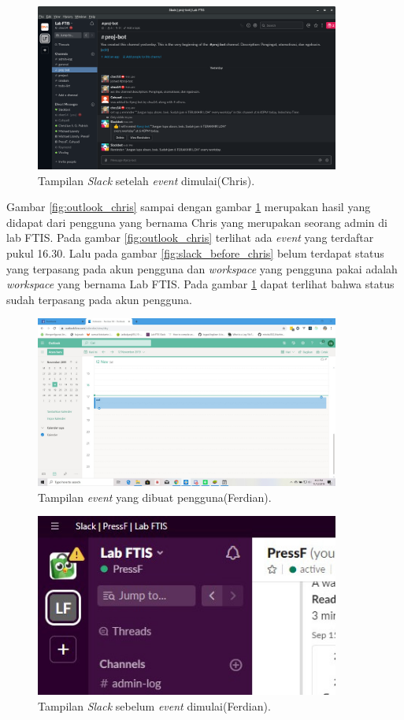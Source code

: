\begin{figure}[h]
  \includegraphics[width=10cm]{./Gambar/PengujianChris/Slack_After.png}
  \centering
  \caption{Tampilan \textit{Slack} setelah \textit{event} dimulai(Chris).}
  \label{fig:slack_after_chris}
\end{figure}

Gambar \ref{fig:outlook_chris} sampai dengan gambar \ref{fig:slack_after_chris} merupakan hasil yang didapat dari pengguna yang bernama Chris yang merupakan seorang admin di lab FTIS. Pada gambar \ref{fig:outlook_chris} terlihat ada \textit{event} yang terdaftar pukul 16.30. Lalu pada gambar \ref{fig:slack_before_chris} belum terdapat status yang terpasang pada akun pengguna dan \textit{workspace} yang pengguna pakai adalah \textit{workspace} yang bernama Lab FTIS. Pada gambar \ref{fig:slack_after_chris} dapat terlihat bahwa status sudah terpasang pada akun pengguna. 
\clearpage

\begin{figure}[h]
  \includegraphics[width=10cm]{./Gambar/PengujianFerdian/Outlook.jpg}
  \centering
  \caption{Tampilan \textit{event} yang dibuat pengguna(Ferdian).}
  \label{fig:outlook_ferdian}
\end{figure}

\begin{figure}[h]
  \includegraphics[width=10cm]{./Gambar/PengujianFerdian/Slack_Before(2).jpg}
  \centering
  \caption{Tampilan \textit{Slack} sebelum \textit{event} dimulai(Ferdian).}
  \label{fig:slack_before_ferdian}
\end{figure}

